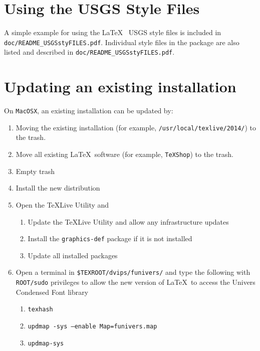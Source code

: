 \documentclass[11pt]{article}
\begin{document}
\section*{\textsf{Using the USGS Style Files}}
A simple example for using the \LaTeX\ \hspace{1pt} USGS style files is included in \texttt{doc/README\_USGSstyFILES.pdf}. Individual style files in the package are also listed and described in \texttt{doc/README\_USGSstyFILES.pdf}.

\section*{\textsf{Updating an existing installation}}
On \texttt{MacOSX}, an existing installation can be updated by:

\begin{enumerate}
	\item Moving the existing installation (for example, \texttt{/usr/local/texlive/2014/}) to the trash.
	\item Move all existing \LaTeX\ software (for example, \texttt{TeXShop}) to the trash.
	\item Empty trash
	\item Install the new distribution
	\item Open the \TeX Live Utility and
	\begin{enumerate}
		\item Update the \TeX Live Utility and allow any infrastructure updates
		\item Install the \texttt{graphics-def} package if it is not installed
		\item Update all installed packages
	\end{enumerate}
	\item Open a terminal in \texttt{\$TEXROOT/dvips/funivers/} and type the following with \texttt{ROOT/sudo} privileges to allow the new version of \LaTeX\ to access the Univers Condensed Font library
	\begin{enumerate}
		\item \texttt{texhash}
		\item \texttt{updmap -sys --enable Map=funivers.map}
		\item \texttt{updmap-sys}
	\end{enumerate}
	
	
\end{enumerate}
\end{document}
